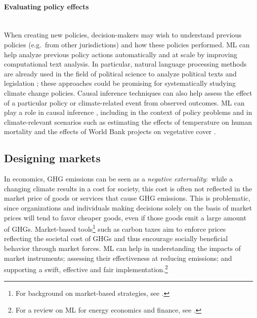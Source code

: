 \documentclass[11pt]{report}
\newcommand{\Gap}{\texorpdfstring{\hfill}{}}
\newcommand{\Rec}{\texorpdfstring{{\small\emph{\color{blue}{\fbox{High Leverage}}}}}{}}
\begin{document}
\paragraph*{Evaluating policy effects}\Gap\mbox{\textbf{\Rec}}\\
When creating new policies, decision-makers may wish to understand previous policies (e.g.~from other jurisdictions) and how these policies performed.
ML can help analyze previous policy actions automatically and at scale by improving computational text analysis. In particular, natural language processing methods are already used in the field of political science to analyze political texts and legislation \cite{grimmer_stewart_2013}; these approaches could be promising for systematically studying climate change policies.
Causal inference techniques can also help assess the effect of a particular policy or climate-related event from observed outcomes.
ML can play a role in causal inference \cite{pearl2019, athey2019machine, doi:10.1080/09332480.2019.1579578}, including in the context of policy problems \cite{kreif2019m, Athey483} and in climate-relevant scenarios such as estimating the effects of temperature on human mortality \cite{hovdahl2019use} and the effects of World Bank projects on vegetative cover \cite{10.1007/978-3-319-71273-4_17}.

\subsection{Designing markets}
\label{subsec:markets}

In economics, GHG emissions can be seen as a \emph{negative externality}:~while a changing climate results in a cost for society, this cost is often not reflected in the market price of goods or services that cause GHG emissions. This is problematic, since organizations and individuals making decisions solely on the basis of market prices will tend to favor cheaper goods, even if those goods emit a large amount of GHGs. Market-based tools\footnote{For background on market-based strategies, see \cite{stiglitz2017report,stern2008economics,ellerman2010pricing}.} such as carbon taxes aim to enforce prices reflecting the societal cost of GHGs and thus encourage socially beneficial behavior through market forces. ML can help in understanding the impacts of market instruments; assessing their effectiveness at reducing emissions; and supporting a swift, effective and fair implementation.\footnote{For a review on ML for energy economics and finance, see \cite{ghoddusi2019machine}.}
\end{document}
